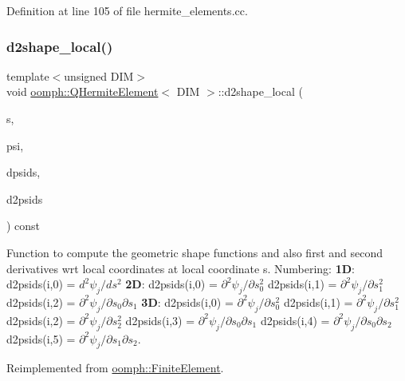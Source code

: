 Definition at line 105 of file hermite\+\_\+elements.\+cc.

\mbox{\label{classoomph_1_1QHermiteElement_aef2bb1abc43f207edd57f6e38cbbe297}} 
\subsubsection{\texorpdfstring{d2shape\+\_\+local()}{d2shape\_local()}\hspace{0.1cm}{\footnotesize\ttfamily [2/3]}}
{\footnotesize\ttfamily template$<$unsigned D\+IM$>$ \\
void \hyperlink{classoomph_1_1QHermiteElement}{oomph\+::\+Q\+Hermite\+Element}$<$ D\+IM $>$\+::d2shape\+\_\+local (\begin{DoxyParamCaption}\item[{const \hyperlink{classoomph_1_1Vector}{Vector}$<$ double $>$ \&}]{s,  }\item[{\hyperlink{classoomph_1_1Shape}{Shape} \&}]{psi,  }\item[{\hyperlink{classoomph_1_1DShape}{D\+Shape} \&}]{dpsids,  }\item[{\hyperlink{classoomph_1_1DShape}{D\+Shape} \&}]{d2psids }\end{DoxyParamCaption}) const\hspace{0.3cm}{\ttfamily [virtual]}}



Function to compute the geometric shape functions and also first and second derivatives wrt local coordinates at local coordinate s. Numbering\+: {\bfseries 1D}\+: d2psids(i,0) = $ d^2 \psi_j / d s^2 $ {\bfseries 2D}\+: d2psids(i,0) = $ \partial^2 \psi_j / \partial s_0^2 $ d2psids(i,1) = $ \partial^2 \psi_j / \partial s_1^2 $ d2psids(i,2) = $ \partial^2 \psi_j / \partial s_0 \partial s_1 $ {\bfseries 3D}\+: d2psids(i,0) = $ \partial^2 \psi_j / \partial s_0^2 $ d2psids(i,1) = $ \partial^2 \psi_j / \partial s_1^2 $ d2psids(i,2) = $ \partial^2 \psi_j / \partial s_2^2 $ d2psids(i,3) = $ \partial^2 \psi_j / \partial s_0 \partial s_1 $ d2psids(i,4) = $ \partial^2 \psi_j / \partial s_0 \partial s_2 $ d2psids(i,5) = $ \partial^2 \psi_j / \partial s_1 \partial s_2 $. 



Reimplemented from \hyperlink{classoomph_1_1FiniteElement_a53e5051582d9da07b9d35da9debd0cd7}{oomph\+::\+Finite\+Element}.


